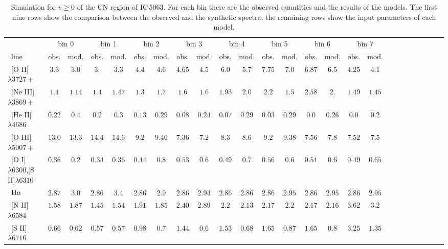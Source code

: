 \documentclass[../thesis.tex]{subfiles}
\begin{document}
\begin{landscape}
\begin{table}

\centering
\caption{Simulation for $v\ge0$ of the CN region of IC\,5063. For each bin there are the observed quantities and the results of the models. The first nine rows show the comparison between the observed and the synthetic spectra, the remaining rows show the input parameters of each model.}
\label{tab:sim_cn+}
\footnotesize{
\begin{tabular}{lcccccccccccccccccccccccc} 
\hline  
\ &\multicolumn{2}{c}{bin 0} &\multicolumn{2}{c}{bin 1}&\multicolumn{2}{c}{bin 2}&\multicolumn{2}{c}{bin 3}&\multicolumn{2}{c}{bin 4}&\multicolumn{2}{c}{bin 5}&\multicolumn{2}{c}{bin 6}&\multicolumn{2}{c}{bin 7}\\
\   line              &obs.  &mod.  & obs.  &mod. &obs.&mod.   &obs.  &mod.  &obs.  &mod.  &obs.  &mod. &obs.&mod.&obs.&mod. \\ 
\hline
\ [O II]$\lambda3727+ $         &$3.3   $&$3.0   $&$3.     $&$ 3.3  $&$4.4  $&$4.6   $&$4.65  $&$4.5   $&$6.0   $&$5.7   $&$7.75  $&$7.0$&$6.87$&$6.5$&$4.25$&$4.1   $\\
\ [Ne III]$\lambda3869+ $       &$1.4   $&$1.14  $&$1.4    $&$ 1.47 $&$1.3  $&$1.7   $&$1.6   $&$1.6   $&$1.93  $&$2.0   $&$2.2   $&$1.5$&$2.58$&$2.$&$1.49$&$1.45  $ \\
\ [He II]$\lambda4686$           &$0.22  $&$0.4   $&$0.2    $&$ 0.3  $&$0.13 $&$0.29  $&$0.08  $&$0.24  $&$0.07  $&$0.29  $&$0.03  $&$0.29$&$0.0$&$0.26$&$0.0$&$0.2 $\\
\ [O III]$\lambda5007+ $        &$13.0  $&$13.3  $&$14.4   $&$ 14.6 $&$ 9.2 $&$ 9.46 $&$ 7.36 $&$ 7.2  $&$ 8.3  $&$ 8.6  $&$ 9.2  $&$ 9.38$&$7.56$&$7.8$&$7.52$&$7.5$\\
\ [O I]$\lambda6300$,[S II]$\lambda6310$  &$0.36  $&$0.2   $&$0.34   $&$0.36  $&$0.44 $&$0.8   $&$0.53  $&$0.6   $&$0.49  $&$0.7   $&$0.56  $&$0.6$&$0.51$&$0.6$&$0.49$&$0.65 $ \\
\ $\rm H\alpha$                 &$2.87  $&$3.0   $&$2.86   $&$ 3.4  $&$2.86 $&$2.9   $&$2.86  $&$2.94  $&$2.86  $&$2.86  $&$2.86  $&$2.95$&$2.86$&$2.95$&$2.86$&$2.95 $\\
\ [N II]$\lambda6584$           &$1.58  $&$1.87  $&$1.45   $&$ 1.54 $&$1.91 $&$1.85  $&$2.40  $&$2.89  $&$2.2   $&$2.13  $&$2.17  $&$2.2$&$2.17$&$2.16$&$3.62$&$3.2 $ \\
\ [S II]$\lambda6716$           &$0.66  $&$0.62  $&$0.57   $&$ 0.57 $&$0.98 $&$0.7   $&$1.44  $&$0.6   $&$1.53  $&$0.68  $&$1.65  $&$0.87$&$1.65$&$0.8$&$3.25$&$1.35 $\\

\end{tabular}}
\end{table}
\end{landscape}
\end{document}
